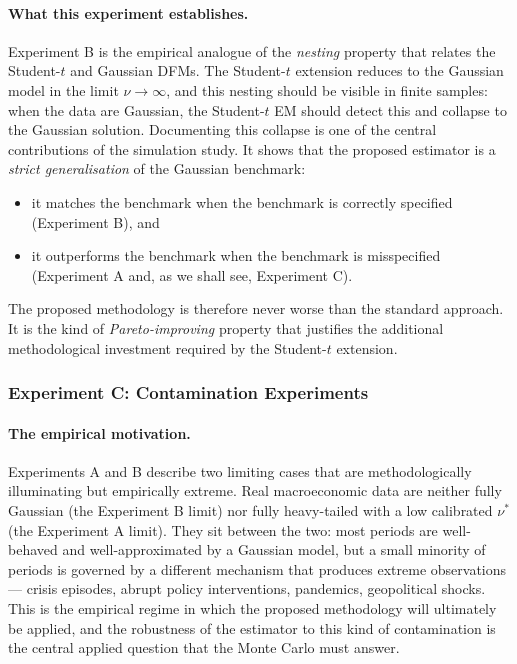 \documentclass[11pt, a4paper, oneside]{article}
\begin{document}
\paragraph{What this experiment establishes.}
Experiment B is the empirical analogue of the \emph{nesting} property
that relates the Student-$t$ and Gaussian DFMs. The Student-$t$
extension reduces to the Gaussian model in the limit $\nu \to \infty$,
and this nesting should be visible in finite samples: when the data
are Gaussian, the Student-$t$ EM should detect this and collapse to
the Gaussian solution. Documenting this collapse is one of the
central contributions of the simulation study. It shows that the
proposed estimator is a \emph{strict generalisation} of the Gaussian
benchmark:
\begin{itemize}[leftmargin=1.5em, itemsep=3pt]
    \item it matches the benchmark when the benchmark is correctly
          specified (Experiment B), and
    \item it outperforms the benchmark when the benchmark is
          misspecified (Experiment A and, as we shall see,
          Experiment C).
\end{itemize}
The proposed methodology is therefore never worse than the standard
approach. It is the kind of \emph{Pareto-improving} property that
justifies the additional methodological investment required by the
Student-$t$ extension.

\subsubsection{Experiment C: Contamination Experiments}
\label{subsubsec:exp-C}

\paragraph{The empirical motivation.}
Experiments A and B describe two limiting cases that are
methodologically illuminating but empirically extreme. Real
macroeconomic data are neither fully Gaussian (the Experiment B
limit) nor fully heavy-tailed with a low calibrated $\nu^*$ (the
Experiment A limit). They sit between the two: most periods are
well-behaved and well-approximated by a Gaussian model, but a
small minority of periods is governed by a different mechanism
that produces extreme observations — crisis episodes, abrupt
policy interventions, pandemics, geopolitical shocks. This is the
empirical regime in which the proposed methodology will ultimately
be applied, and the robustness of the estimator to this kind of
contamination is the central applied question that the Monte
Carlo must answer.
\end{document}
